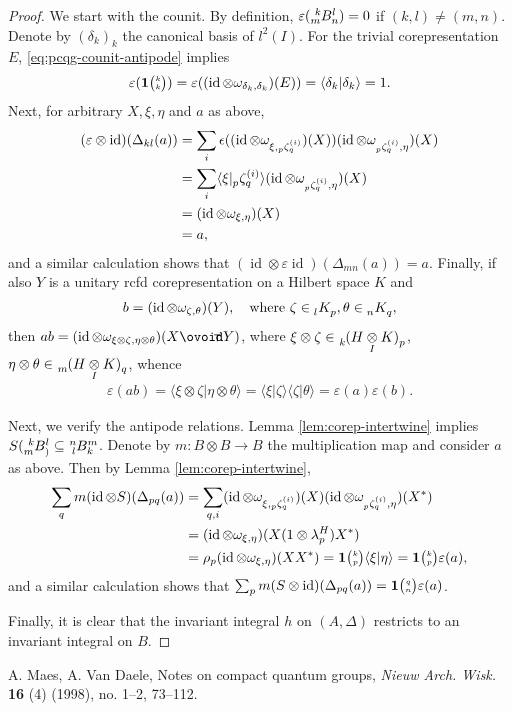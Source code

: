 \documentclass[11pt]{article}
\DeclareMathOperator{\id}{id}
\newcommand{\Circt}{{\mathop{\ooalign{$\ovoid$\cr\hidewidth\raise-.05ex\hbox{$\scriptstyle\mathsf T\mkern3.5mu$}\cr}}}} %
\newcommand{\itimes}{\underset{I}{\otimes}}
\newcommand{\Grt}[3]{#1{\tiny {\begin{pmatrix} #2\\#3\end{pmatrix}}}}
\newcommand{\UnitC}[2]{\Grt{\mathbf{1}}{#1}{#2}}
\newcommand{\Gr}[5]{\tensor*[^{#2}_{#4}]{#1}{^{#3}_{#5}}}%
\newcommand{\Grd}[3]{\Gr{#1}{}{}{#2}{#3}}
\theoremstyle{definition}
\numberwithin{equation}{section}
\begin{document}
\begin{proof}
  We start with the counit.  By definition, $\varepsilon(\Gr{B}{k}{l}{m}{n})=0$ if $(k,l)\neq
  (m,n)$.  Denote by $(\delta_{k})_{k}$ the canonical basis of $l^{2}(I)$. For the trivial
  corepresentation $E$, \eqref{eq:pcqg-counit-antipode} implies
  \begin{align*}
    \varepsilon(\UnitC{k}{k}) = \varepsilon((\id \otimes \omega_{\delta_{k},\delta_{k}})(E)) =
    \langle \delta_{k}|\delta_{k}\rangle = 1.
  \end{align*}
Next,   for arbitrary $X,\xi,\eta$ and $a$ as above,
\begin{align*}
    (\varepsilon \otimes\id)(\Delta_{kl}(a)) &= \sum_{i}\epsilon((\id \otimes
    \omega_{\xi,\Gr{\zeta}{}{(i)}{p}{q}})(X)) (\id \otimes \omega_{\Gr{\zeta}{}{(i)}{p}{q},\eta})(X)
    \\
    &= \sum_{i}\langle \xi|\Gr{\zeta}{}{(i)}{p}{q}\rangle(\id \otimes
    \omega_{\Gr{\zeta}{}{(i)}{p}{q},\eta})(X) \\ &= (\id \otimes \omega_{\xi,\eta})(X) \\ &= a,
  \end{align*}
  and a similar calculation shows that  $    (\id \otimes \varepsilon\id)(\Delta_{mn}(a))=a$.
Finally, if also $Y$ is a unitary rcfd corepresentation on a Hilbert space $K$ and
\begin{align*}
  b=(\id \otimes \omega_{\zeta,\theta})(Y), \quad \text{where } \zeta \in \Grd{K}{l}{p}, \theta \in \Grd{K}{n}{q},
\end{align*}
then $ab = (\id \otimes \omega_{\xi\otimes \zeta,\eta\otimes \theta})(X\Circt Y)$, where $\xi\otimes \zeta \in \Grd{(H\itimes K)}{k}{p}$, $\eta\otimes \theta \in \Grd{(H\itimes
  K)}{m}{q}$, whence
\begin{align*}
  \varepsilon(ab) = \langle \xi\otimes \zeta|\eta\otimes \theta\rangle = \langle
  \xi|\zeta\rangle\langle \zeta|\theta\rangle = \varepsilon(a)\varepsilon(b).
\end{align*}

Next, we verify the antipode relations. 
Lemma \ref{lem:corep-intertwine} implies $S(\Gr{B}{k}{l}{m}) \subseteq \Gr{B}{n}{m}{l}{k}$.
Denote by $m \colon B\otimes B\to B$ the multiplication
map and consider $a$ as above. Then by Lemma \ref{lem:corep-intertwine},
\begin{align*}
  \sum_{q} m(\id \otimes S)(\Delta_{pq}(a)) &= 
  \sum_{q,i} (\id \otimes \omega_{\xi,\Gr{\zeta}{}{(i)}{p}{q}})(X)  (\id \otimes
  \omega_{\Gr{\zeta}{}{(i)}{p}{q},\eta})(X^{*}) \\ &=
 (\id \otimes \omega_{\xi,\eta})(X(1\otimes \lambda^{H}_{p})X^{*})  \\
  &= \rho_{p}  (\id \otimes \omega_{\xi,\eta})(XX^{*})  = \UnitC{k}{p}\langle \xi|\eta\rangle =\UnitC{k}{p} \varepsilon(a),
\end{align*}
and a similar calculation shows that $\sum_{p} m(S \otimes \id)(\Delta_{pq}(a)) = \UnitC{q}{n}\varepsilon(a)$.

Finally, it is clear that the invariant integral $h$ on $(A,\Delta)$ restricts to an invariant
integral on $B$.
\end{proof}




\begin{thebibliography}{00}

 A. Maes, A. Van Daele, Notes on compact quantum groups, \emph{Nieuw Arch. Wisk.} \textbf{16} (4) (1998), no. 1--2, 73--112. 

\end{thebibliography}
\end{document}
